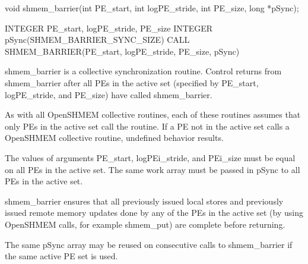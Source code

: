 
\synC
void shmem_barrier(int PE_start, int logPE_stride, int PE_size, long *pSync);

\synF
INTEGER PE_start, logPE_stride, PE_size
INTEGER pSync(SHMEM_BARRIER_SYNC_SIZE)
CALL SHMEM_BARRIER(PE_start, logPE_stride, PE_size, pSync)


{
       shmem\_barrier is a collective synchronization routine.  Control returns
       from shmem\_barrier after all  \ac{PE}s  in  the  active  set	(specified  by
       \ac{PE}\_start, log\ac{PE}\_stride, and \ac{PE}\_size) have called shmem\_barrier.

       As  with	 all OpenSHMEM collective routines, each of these routines assumes
       that only \ac{PE}s in the active set call the routine.  If a \ac{PE} not  in  the
       active  set  calls  a  OpenSHMEM  collective	 routine,  undefined  behavior
       results.

       The  values  of	arguments  \ac{PE}\_start, log\ac{PE}i\_stride, and \ac{PE}i\_size must be
       equal on all \ac{PE}s in the active set.  The same work array must be passed
       in pSync to all \ac{PE}s in the active set.

       shmem\_barrier  ensures  that  all  previously  issued  local stores and
       previously issued remote memory updates done by any of the \ac{PE}s  in  the
       active  set  (by	 using	OpenSHMEM  calls,  for  example  shmem\_put) are
       complete before returning.

       The  same  pSync	 array	may  be	 reused	 on   consecutive   calls   to
       shmem\_barrier if the same active \ac{PE} set is used.
}
